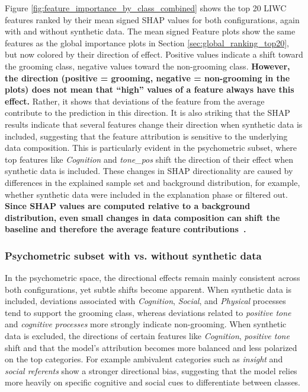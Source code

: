 Figure \ref{fig:feature_importance_by_class_combined} shows the top 20 LIWC features ranked by their mean signed SHAP values for both configurations, again with and without synthetic data. The mean signed Feature plots show the same features as the global importance plots in Section \ref{sec:global_ranking_top20}, but now colored by their direction of effect. Positive values indicate a shift toward the grooming class, negative values toward the non-grooming class. \textbf{However, the direction (positive = grooming, negative = non-grooming in the plots) does not mean that “high” values of a feature always have this effect.} Rather, it shows that deviations of the feature from the average contribute to the prediction in this direction. It is also striking that the SHAP results indicate that several features change their direction when synthetic data is included, suggesting that the feature attribution is sensitive to the underlying data composition. This is particularly evident in the psychometric subset, where top features like \textit{Cognition} and \textit{tone\_pos} shift the direction of their effect when synthetic data is included. These changes in SHAP directionality are caused by differences in the explained sample set and background distribution, for example, whether synthetic data were included in the explanation phase or filtered out. \textbf{Since SHAP values are computed relative to a background distribution, even small changes in data composition can shift the baseline and therefore the average feature contributions~\cite{yuan2023empiricalstudyeffectbackground}.} 

\subsubsection{Psychometric subset with vs. without synthetic data}
In the psychometric space, the directional effects remain mainly consistent across both configurations, yet subtle shifts become apparent. When synthetic data is included, deviations associated with \emph{Cognition}, \emph{Social}, and \emph{Physical} processes tend to support the grooming class, whereas deviations related to \emph{positive tone} and \emph{cognitive processes} more strongly indicate non-grooming. When synthetic data is excluded, the directions of certain features like \textit{Cognition}, \textit{positive tone} shift and that the model’s attribution becomes more balanced and less polarized on the top categories. For example ambivalent categories such as \textit{insight} and \textit{social referents} show a stronger directional bias, suggesting that the model relies more heavily on specific cognitive and social cues to differentiate between classes. 
